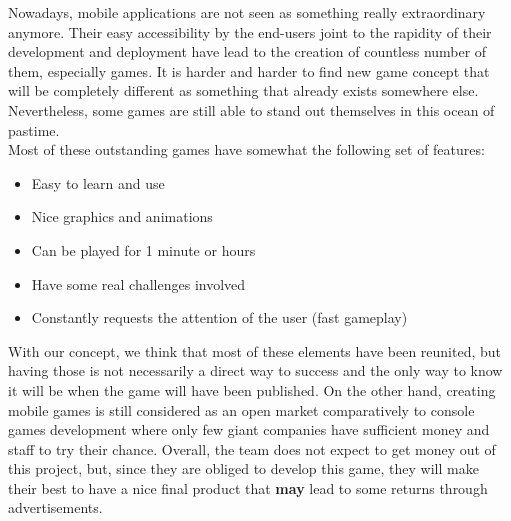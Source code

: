 Nowadays, mobile applications are not seen as something really extraordinary anymore. Their easy accessibility by the end-users joint to the rapidity of their development and deployment have lead to the creation of countless number of them, especially games. It is harder and harder to find new game concept that will be completely different as something that already exists somewhere else. Nevertheless, some games are still able to stand out themselves in this ocean of pastime. \\

Most of these outstanding games have somewhat the following set of features:
\begin{itemize}
  \item Easy to learn and use
  \item Nice graphics and animations
  \item Can be played for 1 minute or hours
  \item Have some real challenges involved
  \item Constantly requests the attention of the user (fast gameplay)
\end{itemize}

With our concept, we think that most of these elements have been reunited, but having those is not necessarily a direct way to success and the only way to know it will be when the game will have been published. On the other hand, creating mobile games is still considered as an open market comparatively to console games development where only few giant companies have sufficient money and staff to try their chance. Overall, the team does not expect to get money out of this project, but, since they are obliged to develop this game, they will make their best to have a nice final product that \textbf{may} lead to some returns through advertisements.
